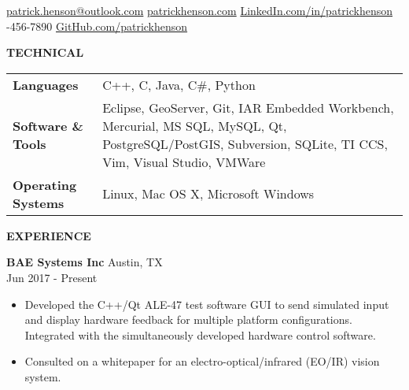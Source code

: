 \documentclass[10pt]{article}
\newcommand{\verticalspace}{\vspace{1.5mm}}
\newcommand{\horizontalrule}{\noindent\hrulefill}
\newcommand{\heading}{\noindent\Large\bf} %
\newcommand{\headingspace}{\vspace{3.5mm}}
\begin{document}
\renewcommand\familydefault{\sfdefault}



\hfill

\vspace{-2mm}
\horizontalrule

\noindent 
\href{mailto:fullname@email.com}{patrick.henson@outlook.com}
\hfill
\href{https://patrickhenson.com}{patrickhenson.com}
\hfill
\href{linkedin.com/in/patrickhenson}{LinkedIn.com/in/patrickhenson}
\\
-456-7890
\hfill
\href{https://github.com/PatrickHenson}{GitHub.com/patrickhenson}

\headingspace
{\heading TECHNICAL}

\verticalspace

\begin{tabular}{@{} p{.2\linewidth} p{.75\linewidth}}

{\bf Languages} & C++, C, Java, C\#, Python \\

{\bf Software \& Tools} & Eclipse, GeoServer, Git, IAR Embedded Workbench, Mercurial, MS SQL, MySQL, Qt, PostgreSQL/PostGIS, Subversion, SQLite, TI CCS, Vim, Visual Studio, VMWare \\

{\bf Operating Systems} & Linux, Mac OS X, Microsoft Windows

\end{tabular}

{\heading EXPERIENCE}

\verticalspace

{\bf BAE Systems Inc} \hfill Austin, TX \\
 \hfill Jun 2017 - Present
\begin{itemize}
\item Developed the C++/Qt ALE-47 test software GUI to send simulated input and display hardware feedback for multiple platform configurations.  Integrated with the simultaneously developed hardware control software.
\item Consulted on a whitepaper for an electro-optical/infrared (EO/IR) vision system.
\end{itemize}
\end{document}

